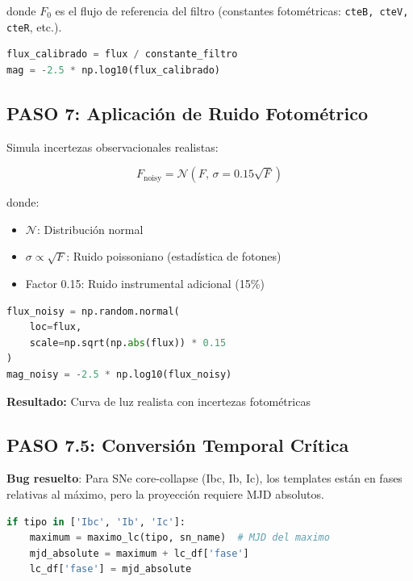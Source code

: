 \documentclass[11pt,a4paper]{article}
\begin{document}
donde $F_0$ es el flujo de referencia del filtro (constantes fotométricas: \texttt{cteB, cteV, cteR}, etc.).

\begin{lstlisting}[language=Python, caption=Calibración fotométrica]
flux_calibrado = flux / constante_filtro
mag = -2.5 * np.log10(flux_calibrado)
\end{lstlisting}

\subsection{PASO 7: Aplicación de Ruido Fotométrico}

Simula incertezas observacionales realistas:

\begin{equation}
F_{\text{noisy}} = \mathcal{N}\left(F, \, \sigma = 0.15 \sqrt{F}\right)
\end{equation}

donde:
\begin{itemize}
    \item $\mathcal{N}$: Distribución normal
    \item $\sigma \propto \sqrt{F}$: Ruido poissoniano (estadística de fotones)
    \item Factor 0.15: Ruido instrumental adicional (15\%)
\end{itemize}

\begin{lstlisting}[language=Python, caption=Aplicación de ruido]
flux_noisy = np.random.normal(
    loc=flux, 
    scale=np.sqrt(np.abs(flux)) * 0.15
)
mag_noisy = -2.5 * np.log10(flux_noisy)
\end{lstlisting}

\textbf{Resultado:} Curva de luz realista con incertezas fotométricas

\subsection{PASO 7.5: Conversión Temporal Crítica }

\textbf{Bug resuelto}: Para SNe core-collapse (Ibc, Ib, Ic), los templates están en fases relativas al máximo, pero la proyección requiere MJD absolutos.

\begin{lstlisting}[language=Python, caption=Conversión temporal]
if tipo in ['Ibc', 'Ib', 'Ic']:
    maximum = maximo_lc(tipo, sn_name)  # MJD del maximo
    mjd_absolute = maximum + lc_df['fase']
    lc_df['fase'] = mjd_absolute
\end{lstlisting}
\end{document}
